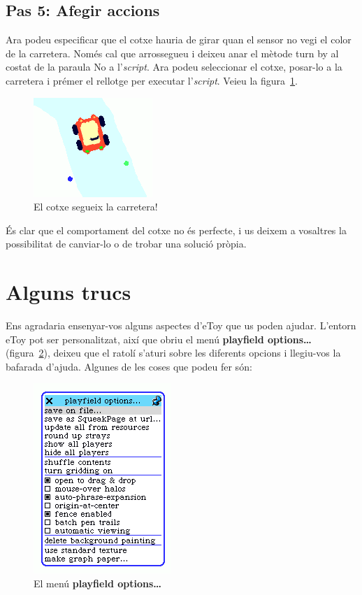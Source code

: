 \subsection{Pas 5: Afegir accions}
Ara podeu especificar que el cotxe hauria de girar quan el sensor no vegi el color de la carretera. Només cal que arrossegueu i deixeu anar el mètode \textsf{turn by} al costat de la paraula \textsf{No} a l'\emph{script}. Ara podeu seleccionar el cotxe, posar-lo a la carretera i prémer el rellotge per executar l'\emph{script}. Veieu la figura~\ref{fig2446}.
\begin{figure}[h!]
\begin{center}
\includegraphics[scale=0.8]{Imatges/figura24-46}
\end{center}
\caption{El cotxe segueix la carretera!}
\label{fig2446}
\end{figure}

És clar que el comportament del cotxe no és perfecte, i us deixem a vosaltres la possibilitat de canviar-lo o de trobar una solució pròpia. 

\section{Alguns trucs}
Ens agradaria ensenyar-vos alguns aspectes d'eToy que us poden ajudar. L'entorn eToy pot ser personalitzat, així que obriu el menú \textbf{playfield options\dots} (figura~\ref{fig2447}), deixeu que el ratolí s'aturi sobre les diferents opcions i llegiu-vos la bafarada d'ajuda. Algunes de les coses que podeu fer són:
\begin{figure}[h!]
\begin{center}
\includegraphics[scale=0.5]{Imatges/figura24-47}
\end{center}
\caption{El menú \textbf{playfield options\dots}}
\label{fig2447}
\end{figure}

